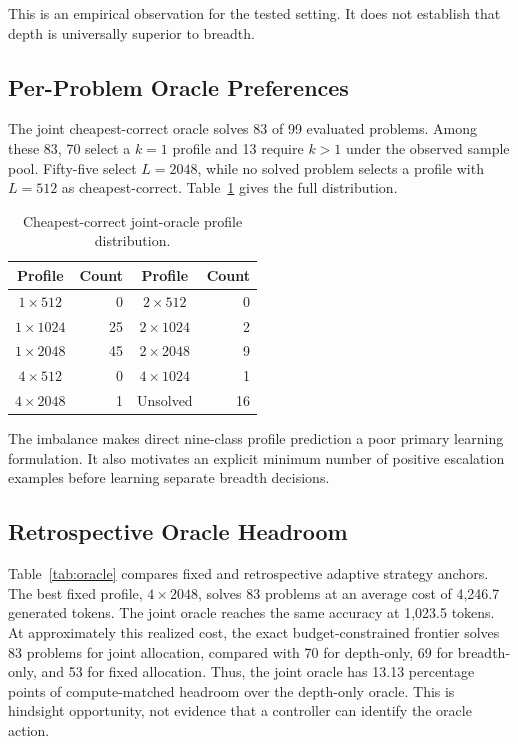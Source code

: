 \documentclass[runningheads]{llncs}
\begin{document}
This is an empirical observation for the tested setting. It does not establish
that depth is universally superior to breadth.

\subsection{Per-Problem Oracle Preferences}

The joint cheapest-correct oracle solves 83 of 99 evaluated problems. Among
these 83, 70 select a $k=1$ profile and 13 require $k>1$ under the observed
sample pool. Fifty-five select $L=2048$, while no solved problem selects a
profile with $L=512$ as cheapest-correct. Table~\ref{tab:preferences} gives the
full distribution.

\begin{table}
\caption{Cheapest-correct joint-oracle profile distribution.}
\label{tab:preferences}
\centering
\begin{tabular}{c|r@{\qquad}c|r}
\hline
Profile & Count & Profile & Count \\
\hline
$1\times512$  & 0  & $2\times512$  & 0 \\
$1\times1024$ & 25 & $2\times1024$ & 2 \\
$1\times2048$ & 45 & $2\times2048$ & 9 \\
$4\times512$  & 0  & $4\times1024$ & 1 \\
$4\times2048$ & 1  & Unsolved       & 16 \\
\hline
\end{tabular}
\end{table}

The imbalance makes direct nine-class profile prediction a poor primary
learning formulation. It also motivates an explicit minimum number of positive
escalation examples before learning separate breadth decisions.

\subsection{Retrospective Oracle Headroom}

Table~\ref{tab:oracle} compares fixed and retrospective adaptive strategy
anchors. The best fixed profile, $4\times2048$, solves 83 problems at an
average cost of 4,246.7 generated tokens. The joint oracle reaches the same
accuracy at 1,023.5 tokens. At approximately this realized cost, the exact
budget-constrained frontier solves 83 problems for joint allocation, compared
with 70 for depth-only, 69 for breadth-only, and 53 for fixed allocation. Thus,
the joint oracle has 13.13 percentage points of compute-matched headroom over
the depth-only oracle. This is hindsight opportunity, not evidence that a
controller can identify the oracle action.
\end{document}
